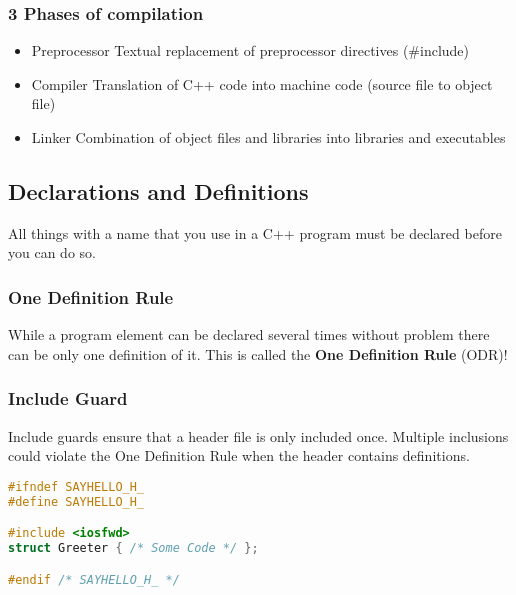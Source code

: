 \subsubsection{3 Phases of compilation}
\begin{itemize}
    \item Preprocessor Textual replacement of preprocessor directives (#include)
    \item Compiler Translation of C++ code into machine code (source file to object file)
    \item Linker Combination of object files and libraries into libraries and executables
\end{itemize}

\subsection{Declarations and Definitions}
All things with a name that you use in a C++ program must be declared before you can do so.

\subsubsection{One Definition Rule}
While a program element can be declared several times without problem there can be only one definition of it. This is called the \textbf{One Definition Rule} (ODR)!

\subsubsection{Include Guard}
Include guards ensure that a header file is only included once. Multiple inclusions could violate the One Definition Rule when the header contains definitions.

\begin{lstlisting}[style=frame, style= linenumbers, language=C]
#ifndef SAYHELLO_H_
#define SAYHELLO_H_

#include <iosfwd>
struct Greeter { /* Some Code */ };

#endif /* SAYHELLO_H_ */
\end{lstlisting}

